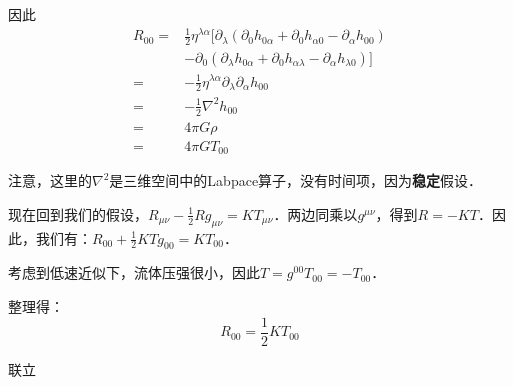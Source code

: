 因此
\begin{equation}
\begin{aligned}
R_{00}=&\frac{1}{2}\eta^{\lambda\alpha}[\partial_\lambda(\partial_0 h_{0 \alpha}+\partial_0 h_{\alpha0}-\partial_\alpha h_{00})\\
&-\partial_0(\partial_\lambda h_{0\alpha}+\partial_0 h_{\alpha\lambda}-\partial_\alpha h_{\lambda0})]\\
=&-\frac{1}{2}\eta^{\lambda\alpha}\partial_\lambda\partial_\alpha h_{00}\\
=&-\frac{1}{2}\nabla^2 h_{00}\\
=&4\pi G\rho\\
=&4\pi GT_{00}
\end{aligned}
\end{equation}

注意，这里的$\nabla^2$是三维空间中的Labpace算子，没有时间项，因为\textbf{稳定}假设．


现在回到我们的假设，$R_{\mu\nu}-\frac{1}{2}Rg_{\mu\nu}=KT_{\mu\nu}$．两边同乘以$g^{\mu\nu}$，得到$R=-KT$．因此，我们有：$R_{00}+\frac{1}{2}KTg_{00}=KT_{00}$．

考虑到低速近似下，流体压强很小，因此$T=g^{00}T_{00}=-T_{00}$．

整理得：
\begin{equation}
R_{00}=\frac{1}{2}KT_{00}
\end{equation}

联立















